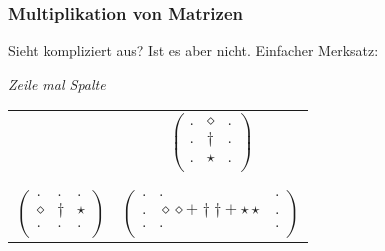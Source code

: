 \documentclass{beamer}
\begin{document}
\begin{frame}
  \frametitle{Multiplikation von Matrizen}
  Sieht kompliziert aus? Ist es aber nicht. Einfacher Merksatz:


  \begin{center}
    \huge
    \textit{Zeile mal Spalte}
  \end{center}
  \begin{center}
  \begin{tabular}{c|c}
    &$\begin{pmatrix}
      . & \diamond & . \\
      . & \dagger & . \\
      . & \star & . \\
    \end{pmatrix}$\\
    \\
    \hline
    \\
    $\begin{pmatrix}
      . & . & . \\
      \diamond & \dagger & \star \\
      . & . & . \\
    \end{pmatrix}$ & $\begin{pmatrix}
      . & . & . \\
      . &\diamond \diamond + \dagger \dagger +\star \star & . \\
      . & . & . \\
    \end{pmatrix}$  
  \end{tabular}
\end{center}
\end{frame}
\end{document}
